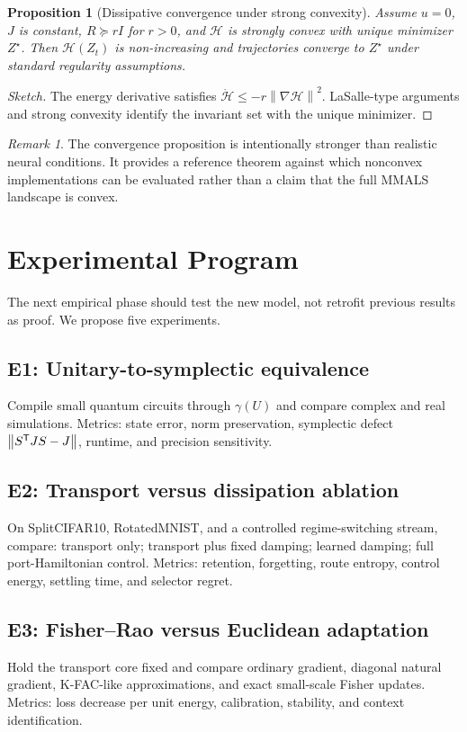 \documentclass[11pt]{article}
\newtheorem{proposition}{Proposition}
\theoremstyle{definition}\newtheorem{definition}{Definition}\newtheorem{assumption}{Assumption}
\theoremstyle{remark}\newtheorem{remark}{Remark}
\newcommand{\norm}[1]{\left\lVert #1\right\rVert}\newcommand{\ip}[2]{\left\langle #1,#2\right\rangle}
\begin{document}
\begin{proposition}[Dissipative convergence under strong convexity]
Assume $u=0$, $J$ is constant, $R\succeq rI$ for $r>0$, and $\mathcal H$ is strongly convex with unique minimizer $Z^\star$. Then $\mathcal H(Z_t)$ is non-increasing and trajectories converge to $Z^\star$ under standard regularity assumptions.
\end{proposition}
\begin{proof}[Sketch]
The energy derivative satisfies $\dot{\mathcal H}\le-r\norm{\nabla\mathcal H}^2$. LaSalle-type arguments and strong convexity identify the invariant set with the unique minimizer.
\end{proof}

\begin{remark}
The convergence proposition is intentionally stronger than realistic neural conditions. It provides a reference theorem against which nonconvex implementations can be evaluated rather than a claim that the full MMALS landscape is convex.
\end{remark}

\section{Experimental Program}
The next empirical phase should test the new model, not retrofit previous results as proof. We propose five experiments.

\subsection{E1: Unitary-to-symplectic equivalence}
Compile small quantum circuits through $\gamma(U)$ and compare complex and real simulations. Metrics: state error, norm preservation, symplectic defect $\norm{S\T JS-J}$, runtime, and precision sensitivity.

\subsection{E2: Transport versus dissipation ablation}
On SplitCIFAR10, RotatedMNIST, and a controlled regime-switching stream, compare: transport only; transport plus fixed damping; learned damping; full port-Hamiltonian control. Metrics: retention, forgetting, route entropy, control energy, settling time, and selector regret.

\subsection{E3: Fisher--Rao versus Euclidean adaptation}
Hold the transport core fixed and compare ordinary gradient, diagonal natural gradient, K-FAC-like approximations, and exact small-scale Fisher updates. Metrics: loss decrease per unit energy, calibration, stability, and context identification.
\end{document}
